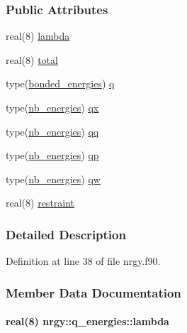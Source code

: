 \subsubsection*{Public Attributes}
\begin{DoxyCompactItemize}
\item 
real(8) \hyperlink{structnrgy_1_1q__energies_a7b56a47e168e7e0f9b1d3e32c738e958}{lambda}
\item 
real(8) \hyperlink{structnrgy_1_1q__energies_a063e4eff4f4042b322606d5dcfb8b1d8}{total}
\item 
type(\hyperlink{structnrgy_1_1bonded__energies}{bonded\-\_\-energies}) \hyperlink{structnrgy_1_1q__energies_a841e639b4b7b12fecc90ba16c1f9b76c}{q}
\item 
type(\hyperlink{structnrgy_1_1nb__energies}{nb\-\_\-energies}) \hyperlink{structnrgy_1_1q__energies_a363f45711811f2655262a4969097cbbc}{qx}
\item 
type(\hyperlink{structnrgy_1_1nb__energies}{nb\-\_\-energies}) \hyperlink{structnrgy_1_1q__energies_a6fcead6abfbf219f96c21652fc29db9d}{qq}
\item 
type(\hyperlink{structnrgy_1_1nb__energies}{nb\-\_\-energies}) \hyperlink{structnrgy_1_1q__energies_a88ca83ee99191c71525dc53260d0a481}{qp}
\item 
type(\hyperlink{structnrgy_1_1nb__energies}{nb\-\_\-energies}) \hyperlink{structnrgy_1_1q__energies_ad0788f64e5d28e57f3bf465aa881d7c7}{qw}
\item 
real(8) \hyperlink{structnrgy_1_1q__energies_a858c54d5eb6587a0f254c7979701a27b}{restraint}
\end{DoxyCompactItemize}


\subsubsection{Detailed Description}


Definition at line 38 of file nrgy.\-f90.



\subsubsection{Member Data Documentation}
\hypertarget{structnrgy_1_1q__energies_a7b56a47e168e7e0f9b1d3e32c738e958}{
\paragraph[{lambda}]{\setlength{\rightskip}{0pt plus 5cm}real(8) nrgy\-::q\-\_\-energies\-::lambda}}\label{structnrgy_1_1q__energies_a7b56a47e168e7e0f9b1d3e32c738e958}


